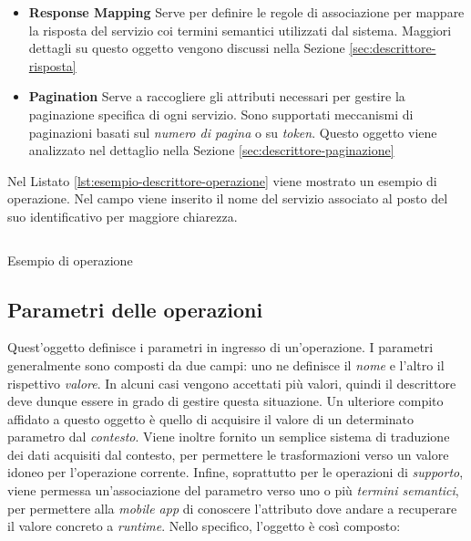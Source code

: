\begin{itemize}
	\item \textbf{Response Mapping}
	Serve per definire le regole di associazione per mappare la risposta del servizio coi termini semantici utilizzati dal sistema. Maggiori dettagli su questo oggetto vengono discussi nella Sezione \ref{sec:descrittore-risposta}
	\item \textbf{Pagination}
	Serve a raccogliere gli attributi necessari per gestire la paginazione specifica di ogni servizio. Sono supportati meccanismi di paginazioni basati sul \emph{numero di pagina} o su \emph{token}. Questo oggetto viene analizzato nel dettaglio nella Sezione \ref{sec:descrittore-paginazione}
\end{itemize}

Nel Listato \ref{lst:esempio-descrittore-operazione} viene mostrato un esempio di operazione. Nel campo  viene inserito il nome del servizio associato al posto del suo identificativo per maggiore chiarezza.

\begin{listing}[H]
	\inputminted{json}{5-implementazione-backend/Codice/esempio_descrittore_operazione.json}
	\caption{Esempio di operazione}
	\label{lst:esempio-descrittore-operazione}
\end{listing}

\subsection{Parametri delle operazioni\label{sec:descrittore-parametri}}

Quest'oggetto definisce i parametri in ingresso di un'operazione. I parametri generalmente sono composti da due campi: uno ne definisce il \emph{nome} e l'altro il rispettivo \emph{valore}. In alcuni casi vengono accettati più valori, quindi il descrittore deve dunque essere in grado di gestire questa situazione. Un ulteriore compito affidato a questo oggetto è quello di acquisire il valore di un determinato parametro dal \emph{contesto}. Viene inoltre fornito un semplice sistema di traduzione dei dati acquisiti dal contesto, per permettere le trasformazioni verso un valore idoneo per l'operazione corrente. Infine, soprattutto per le operazioni di \emph{supporto}, viene permessa un'associazione del parametro verso uno o più \emph{termini semantici}, per permettere alla \emph{mobile app} di conoscere l'attributo dove andare a recuperare il valore concreto a \emph{runtime}. Nello specifico, l'oggetto è così composto:

